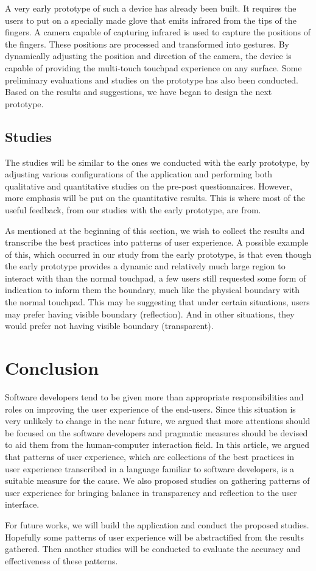 \documentclass[a4paper,titlepage]{article}
\begin{document}
A very early prototype of such a device has already been built. It
requires the users to put on a specially made glove that emits
infrared from the tips of the fingers. A camera capable of capturing
infrared is used to capture the positions of the fingers. These
positions are processed and transformed into gestures. By dynamically
adjusting the position and direction of the camera, the device is
capable of providing the multi-touch touchpad experience on any
surface. Some preliminary evaluations and studies on the prototype has
also been conducted. Based on the results and suggestions, we have
began to design the next prototype.

\subsection{Studies}
The studies will be similar to the ones we conducted with the early
prototype, by adjusting various configurations of the application and
performing both qualitative and quantitative studies on the pre-post
questionnaires. However, more emphasis will be put on the quantitative
results. This is where most of the useful feedback, from our studies
with the early prototype, are from.

As mentioned at the beginning of this section, we wish to collect the
results and transcribe the best practices into patterns of user
experience. A possible example of this, which occurred in our study
from the early prototype, is that even though the early prototype
provides a dynamic and relatively much large region to interact with
than the normal touchpad, a few users still requested some form of
indication to inform them the boundary, much like the physical
boundary with the normal touchpad. This may be suggesting that under
certain situations, users may prefer having visible boundary
(reflection). And in other situations, they would prefer not having
visible boundary (transparent).


\section{Conclusion}
\label{sec:conclusion}
Software developers tend to be given more than appropriate
responsibilities and roles on improving the user experience of the
end-users. Since this situation is very unlikely to change in the near
future, we argued that more attentions should be focused on the
software developers and pragmatic measures should be devised to aid
them from the human-computer interaction field. In this article, we
argued that patterns of user experience, which are collections of the
best practices in user experience transcribed in a language familiar
to software developers, is a suitable measure for the cause. We also
proposed studies on gathering patterns of user experience for bringing
balance in transparency and reflection to the user interface.

For future works, we will build the application and conduct the
proposed studies. Hopefully some patterns of user experience will be
abstractified from the results gathered. Then another studies will be
conducted to evaluate the accuracy and effectiveness of these
patterns.




\end{document}
